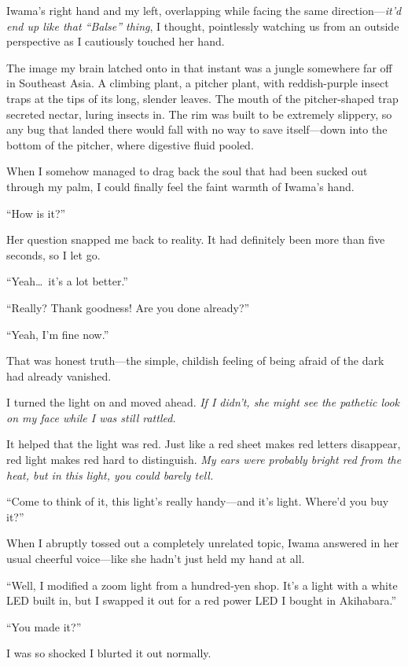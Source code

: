 \documentclass[
    a4paper,
    12pt,
    twoside,
    openany,
    UTF8,
    fontset=windows
]{ctexbook}
\begin{document}
Iwama's right hand and my left, overlapping while facing the same direction---\textit{it'd end up like that ``Balse'' thing}, I thought, pointlessly watching us from an outside perspective as I cautiously touched her hand.

The image my brain latched onto in that instant was a jungle somewhere far off in Southeast Asia. A climbing plant, a pitcher plant, with reddish-purple insect traps at the tips of its long, slender leaves. The mouth of the pitcher-shaped trap secreted nectar, luring insects in. The rim was built to be extremely slippery, so any bug that landed there would fall with no way to save itself---down into the bottom of the pitcher, where digestive fluid pooled.

When I somehow managed to drag back the soul that had been sucked out through my palm, I could finally feel the faint warmth of Iwama's hand.

``How is it?''

Her question snapped me back to reality. It had definitely been more than five seconds, so I let go.

``Yeah\dots\ it's a lot better.''

``Really? Thank goodness! Are you done already?''

``Yeah, I'm fine now.''

That was honest truth---the simple, childish feeling of being afraid of the dark had already vanished.

I turned the light on and moved ahead. \textit{If I didn't, she might see the pathetic look on my face while I was still rattled.}

It helped that the light was red. Just like a red sheet makes red letters disappear, red light makes red hard to distinguish. \textit{My ears were probably bright red from the heat, but in this light, you could barely tell.}

``Come to think of it, this light's really handy---and it's light. Where'd you buy it?''

When I abruptly tossed out a completely unrelated topic, Iwama answered in her usual cheerful voice---like she hadn't just held my hand at all.

``Well, I modified a zoom light from a hundred-yen shop. It's a light with a white LED built in, but I swapped it out for a red power LED I bought in Akihabara.''

``You made it?''

I was so shocked I blurted it out normally.
\end{document}
